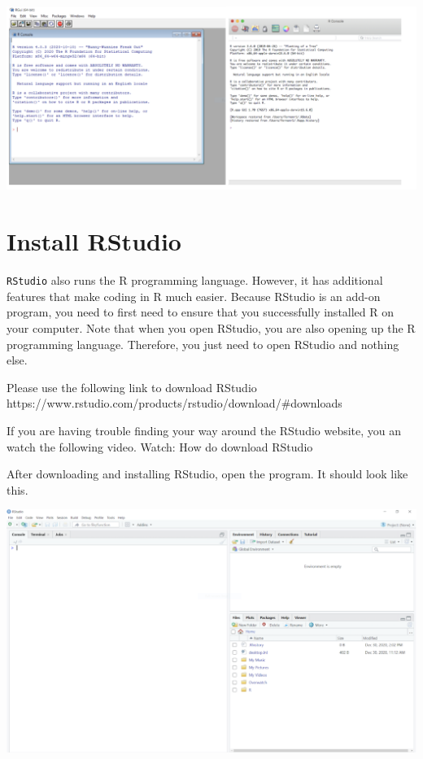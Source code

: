 \documentclass[
]{book}
\begin{document}
\includegraphics[width=1\linewidth]{images-figures/02-r-programs}

\hypertarget{install-rstudio}{%
\section{Install RStudio}\label{install-rstudio}}

\texttt{RStudio} also runs the R programming language. However, it has additional features that make coding in R much easier. Because RStudio is an add-on program, you need to first need to ensure that you successfully installed R on your computer. Note that when you open RStudio, you are also opening up the R programming language. Therefore, you just need to open RStudio and nothing else.

Please use the following link to download RStudio
https://www.rstudio.com/products/rstudio/download/\#downloads

If you are having trouble finding your way around the RStudio website, you an watch the following video.
Watch: How do download RStudio

After downloading and installing RStudio, open the program. It should look like this.

\includegraphics[width=1\linewidth]{images-figures/02-r-studio-gui}
\end{document}
